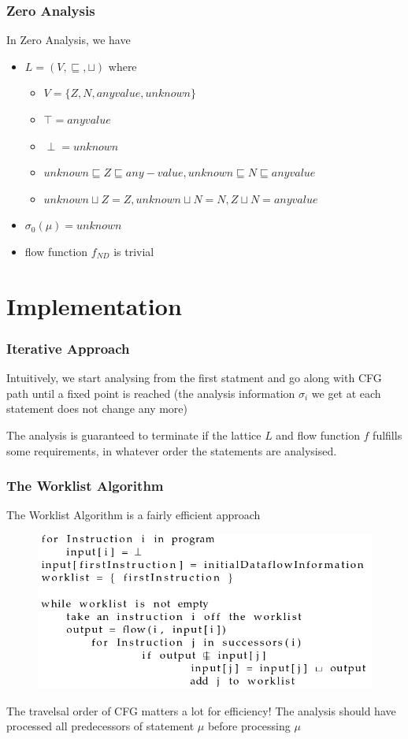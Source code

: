 \documentclass[]{beamer}
\begin{document}
\begin{frame}
  \frametitle{Zero Analysis}
  In Zero Analysis, we have
  \begin{itemize}
    \item $L=(V, \sqsubseteq, \sqcup)$ where
      \begin{itemize}
      \item $V=\{Z, N, anyvalue, unknown\}$
      \item $\top = anyvalue$
      \item $\perp = unknown$
      \item $unknown \sqsubseteq Z \sqsubseteq any-value, unknown \sqsubseteq N \sqsubseteq anyvalue$
      \item $unknown \sqcup Z = Z, unknown \sqcup N = N, Z \sqcup N = anyvalue$
      \end{itemize}
    \item $\sigma_0(\mu) = unknown$
    \item flow function $f_{ND}$ is trivial
  \end{itemize}
\end{frame}

\section{Implementation}
\frame{\tableofcontents[currentsection]}

\begin{frame}
  \frametitle{Iterative Approach}
  Intuitively, we start analysing from the first statment and go along with CFG path until
  a \alert{fixed point} is reached (the analysis
  information $\sigma_i$ we get at each statement does not change any more)

  \vspace{1em}\pause
  The analysis is guaranteed to terminate if the lattice $L$ and flow function $f$ fulfills
  some requirements, in whatever order the statements are analysised.
\end{frame}

\begin{frame}
  \frametitle{The Worklist Algorithm}
  The Worklist Algorithm is a fairly efficient approach
  \begin{figure}
    \includegraphics[width=.65\textwidth]{figures/worklist}
  \end{figure}

  \vspace{1em}\pause
  The travelsal order of CFG matters a lot for efficiency!
  The analysis should have processed all predecessors of statement $\mu$
  before processing $\mu$
\end{frame}
\end{document}
